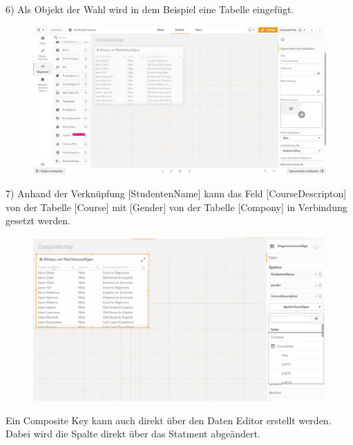 6) Als Objekt der Wahl wird in dem Beispiel eine Tabelle eingefügt.
\begin{figure}[H]
	\centering
	\includegraphics[scale = 0.3]{attachment/chapter_3/Scc024}
	\caption{}
	\label{fig:Scc024}
\end{figure}
7) Anhand der Verknüpfung [StudentenName] kann das Feld [CourseDescripton] von der Tabelle [Course] mit [Gender] von der Tabelle [Compony] in Verbindung gesetzt werden.
\begin{figure}[H]
	\centering
	\includegraphics[scale = 0.3]{attachment/chapter_3/Scc025}
	\caption{}
	\label{fig:Scc025}
\end{figure}

Ein Composite Key kann auch direkt über den Daten Editor erstellt werden. Dabei wird die Spalte direkt über das  Statment abgeändert.

